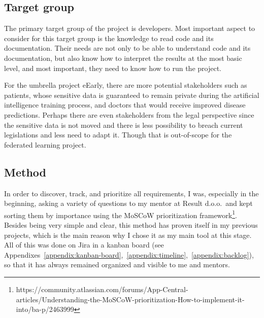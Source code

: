 \subsection{Target group}
The primary target group of the project is developers. Most important aspect to consider for this target group is the knowledge to read code and its documentation. Their needs are not only to be able to understand code and its documentation, but also know how to interpret the results at the most basic level, and most important, they need to know how to run the project.

For the umbrella project eEarly, there are more potential stakeholders such as patients, whose sensitive data is guaranteed to remain private during the artificial intelligence training process, and doctors that would receive improved disease predictions. Perhaps there are even stakeholders from the legal perspective since the sensitive data is not moved and there is less possibility to breach current legislations and less need to adapt it. Though that is out-of-scope for the federated learning project.


\subsection{Method} \label{subsec:method}
In order to discover, track, and prioritize all requirements, I was, especially in the beginning, asking a variety of questions to my mentor at Result d.o.o.\ and kept sorting them by importance using the MoSCoW prioritization framework\footnote{https://community.atlassian.com/forums/App-Central-articles/Understanding-the-MoSCoW-prioritization-How-to-implement-it-into/ba-p/2463999}. Besides being very simple and clear, this method has proven itself in my previous projects, which is the main reason why I chose it as my main tool at this stage. All of this was done on Jira in a kanban board (see Appendixes~\ref{appendix:kanban-board},~\ref{appendix:timeline},~\ref{appendix:backlog}), so that it has always remained organized and visible to me and mentors.


